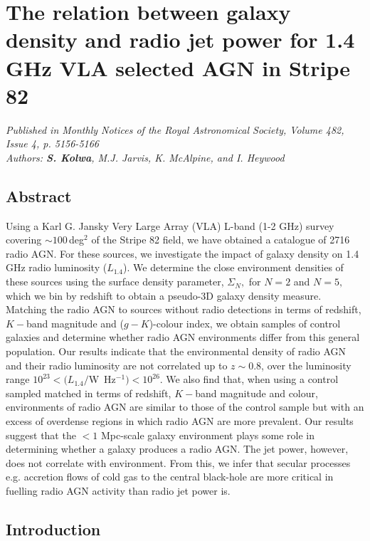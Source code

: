 \chapter[The Influence of galaxy density on radio AGN power]{The relation between galaxy density and radio jet power for 1.4 GHz VLA selected AGN in Stripe 82}

{\it Published in Monthly Notices of the Royal Astronomical Society, Volume 482, Issue 4, p. 5156-5166\\
Authors: {\bf S. Kolwa},
M.J. Jarvis,
K. McAlpine, and
I. Heywood} \\

\section*{Abstract}
Using a Karl G. Jansky Very Large Array (VLA) L-band (1-2 GHz) survey covering $\sim100$\,deg$^2$ of the Stripe 82 field, we have obtained a catalogue of 2716 radio AGN. For these sources, we investigate the impact of galaxy density on 1.4 GHz radio luminosity ($L_{1.4}$). We determine the close environment densities of these sources using the surface density parameter, $\Sigma_N,$ for $N=2$ and $N=5,$ which we bin by redshift to obtain a pseudo-3D galaxy density measure. Matching the radio AGN to sources without radio detections in terms of redshift, $K-$band magnitude and ($g-K$)-colour index, we obtain samples of control galaxies and determine whether radio AGN environments differ from this general population. Our results indicate that the environmental density of radio AGN and their radio luminosity are not correlated up to $z \sim 0.8$, over the luminosity range $10^{23} < (L_{1.4} / $W~Hz$^{-1}) < 10^{26}$. We also find that, when using a control sampled matched in terms of redshift, $K-$band magnitude and colour, environments of radio AGN are similar to those of the control sample but with an excess of overdense regions in which radio AGN are more prevalent. Our results suggest that the $<1$ Mpc-scale galaxy environment plays some role in determining whether a galaxy produces a radio AGN. The jet power, however, does not correlate with environment. From this, we infer that secular processes e.g. accretion flows of cold gas to the central black-hole are more critical in fuelling radio AGN activity than radio jet power is.
 
\section{Introduction}

